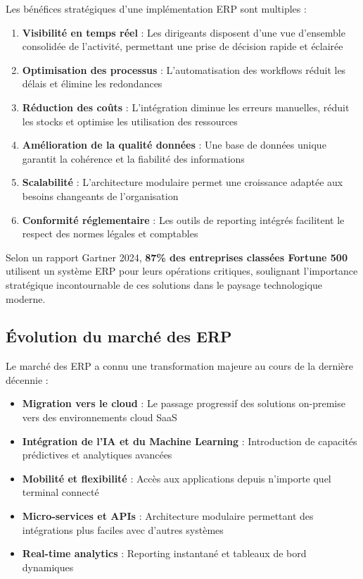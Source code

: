 \documentclass[12pt,a4paper,oneside]{report}
\begin{document}
\vspace{0.3cm}

Les bénéfices stratégiques d'une implémentation ERP sont multiples :

\begin{enumerate}[label=(\roman*), itemsep=0.2em]
	\item \textbf{Visibilité en temps réel} : Les dirigeants disposent d'une vue d'ensemble consolidée de l'activité, permettant une prise de décision rapide et éclairée
	\item \textbf{Optimisation des processus} : L'automatisation des workflows réduit les délais et élimine les redondances
	\item \textbf{Réduction des coûts} : L'intégration diminue les erreurs manuelles, réduit les stocks et optimise les utilisation des ressources
	\item \textbf{Amélioration de la qualité données} : Une base de données unique garantit la cohérence et la fiabilité des informations
	\item \textbf{Scalabilité} : L'architecture modulaire permet une croissance adaptée aux besoins changeants de l'organisation
	\item \textbf{Conformité réglementaire} : Les outils de reporting intégrés facilitent le respect des normes légales et comptables
\end{enumerate}

Selon un rapport Gartner 2024, \textbf{87\% des entreprises classées Fortune 500} utilisent un système ERP pour leurs opérations critiques, 
soulignant l'importance stratégique incontournable de ces solutions dans le paysage technologique moderne.

\subsection{Évolution du marché des ERP}\label{ch2:erp-evolution}

Le marché des ERP a connu une transformation majeure au cours de la dernière décennie :

\begin{itemize}[label=---, itemsep=0.15em]
	\item \textbf{Migration vers le cloud} : Le passage progressif des solutions on-premise vers des environnements cloud SaaS
	\item \textbf{Intégration de l'IA et du Machine Learning} : Introduction de capacités prédictives et analytiques avancées
	\item \textbf{Mobilité et flexibilité} : Accès aux applications depuis n'importe quel terminal connecté
	\item \textbf{Micro-services et APIs} : Architecture modulaire permettant des intégrations plus faciles avec d'autres systèmes
	\item \textbf{Real-time analytics} : Reporting instantané et tableaux de bord dynamiques
\end{itemize}
\end{document}
